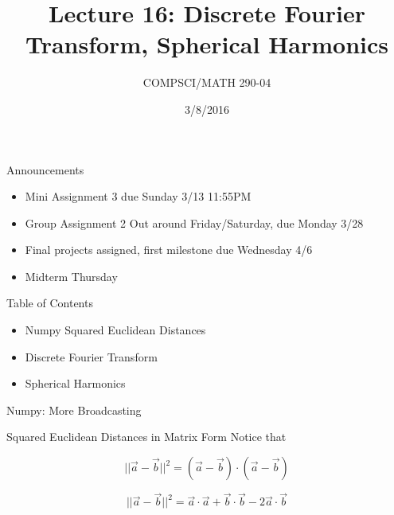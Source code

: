 \documentclass{beamer}
\title{Lecture 16: Discrete Fourier Transform, Spherical Harmonics}
\date{3/8/2016}
\institute{Chris Tralie, Duke University}
\author{COMPSCI/MATH 290-04}
\begin{document}
\frame{\titlepage}

\begin{frame}{Announcements}
\begin{itemize}[label=$\vartriangleright$]

\item Mini Assignment 3 due Sunday 3/13 11:55PM

\item Group Assignment 2 Out around Friday/Saturday, due Monday 3/28

\item Final projects assigned, first milestone due Wednesday 4/6

\item Midterm Thursday

\end{itemize}

\end{frame}

\begin{frame}{Table of Contents}
\begin{itemize}[label=$\blacktriangleright$]
	\item Numpy Squared Euclidean Distances
\end{itemize}
\begin{itemize}[label=$\vartriangleright$]
	\item Discrete Fourier Transform
\end{itemize}
\begin{itemize}[label=$\vartriangleright$]
	\item Spherical Harmonics
\end{itemize}
\end{frame}


\begin{frame}{Numpy: More Broadcasting}



\end{frame}


\begin{frame}{Squared Euclidean Distances in Matrix Form}
Notice that

\[ ||\vec{a} - \vec{b}||^2 = (\vec{a} - \vec{b}) \cdot (\vec{a}-\vec{b}) \]

\[ ||\vec{a} - \vec{b}||^2 = \vec{a} \cdot \vec{a} + \vec{b} \cdot \vec{b} - 2 \vec{a} \cdot \vec{b} \]


\end{frame}
\end{document}
